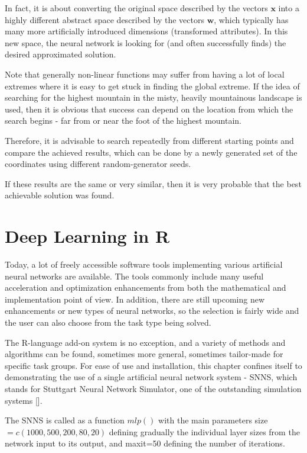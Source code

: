 In fact, it is about converting the original space described by the vectors $\mathbf{x}$ into a highly different abstract space described by the vectors $\mathbf{w}$, which typically has many more artificially introduced dimensions (transformed attributes). In this new space, the neural network is looking for (and often successfully finds) the desired approximated solution.

Note that generally non-linear functions may suffer from having a lot of local extremes where it is easy to get stuck in finding the global extreme. If the idea of searching for the highest mountain in the misty, heavily mountainous landscape is used, then it is obvious that success can depend on the location from which the search begins - far from or near the foot of the highest mountain.

Therefore, it is advisable to search repeatedly from different starting points and compare the achieved results, which can be done by a newly generated set of the coordinates using different random-generator seeds.

If these results are the same or very similar, then it is very probable that the best achievable solution was found.

\section{Deep Learning in R}

Today, a lot of freely accessible software tools implementing various artificial neural networks are available. The tools commonly include many useful acceleration and optimization enhancements from both the mathematical and implementation point of view. In addition, there are still upcoming new enhancements
or new types of neural networks, so the selection is fairly wide and the user can also choose from the task type being solved.

The R-language add-on system is no exception, and a variety of methods and algorithms can be found, sometimes more general, sometimes tailor-made for specific task groups. For ease of use and installation, this chapter confines itself to demonstrating the use of a single artificial neural network system - SNNS, which stands for Stuttgart Neural Network Simulator, one of the outstanding simulation systems [\cite{ref287}].

The SNNS is called as a function $mlp()$ with the main parameters size $=c(1000,500,200,80,20)$ defining gradually the individual layer sizes from the network input to its output, and maxit=50 defining the number of iterations.

